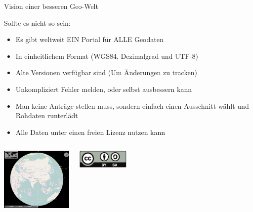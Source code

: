 \documentclass[handout]{beamer}
\begin{document}
\begin{frame}{Vision einer besseren Geo-Welt}

 Sollte es nicht so sein:
  \begin{itemize}
    \item Es gibt weltweit EIN Portal für ALLE Geodaten 
    \item In einheitlichem Format (WGS84, Dezimalgrad und UTF-8)
    \item Alte Versionen verfügbar sind (Um Änderungen zu tracken)
    \item Unkompliziert Fehler melden, oder selbst ausbessern kann
\pause
    \item Man keine Anträge stellen muss, sondern einfach einen Ausschnitt wählt und Rohdaten runterlädt
    \item Alle Daten unter einen freien Lizenz nutzen kann
  \end{itemize}

  \begin{columns}[c]
        \begin{center}
  \includegraphics[width=3.5cm]{marble.png}
  \end{center}
      \begin{center}
    \includegraphics[width=2.5cm]{cc-by-sa.pdf}
  \end{center}
\end{columns}

\end{frame}
\end{document}
